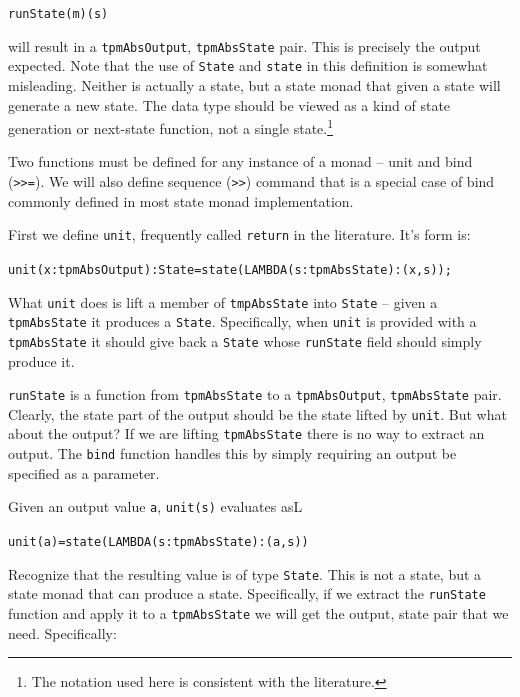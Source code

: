 \documentclass[10pt]{article}
\begin{document}
\begin{alltt}
  runState(m)(s)
\end{alltt}

\noindent will result in a \verb!tpmAbsOutput!, \verb!tpmAbsState!
pair.  This is precisely the output expected.  Note that the use of
\verb!State! and \verb!state! in this definition is somewhat
misleading.  Neither is actually a state, but a state monad that given
a state will generate a new state.  The data type should be viewed as
a kind of state generation or next-state function, not a single
state.\footnote{The notation used here is consistent with the
  literature.}

Two functions must be defined for any instance of a monad -- unit and
bind (\verb!>>=!).  We will also define sequence (\verb!>>!) command
that is a special case of bind commonly defined in most state monad
implementation.

First we define \verb!unit!, frequently called \verb!return! in the
literature.  It's form is:

\begin{alltt}
  unit(x:tpmAbsOutput):State = state(LAMBDA (s:tpmAbsState) : (x,s));
\end{alltt}

What \verb!unit! does is lift a member of \verb!tmpAbsState! into
\verb!State! -- given a \verb!tpmAbsState! it produces a \verb!State!.
Specifically, when \verb!unit! is provided with a \verb!tpmAbsState!
it should give back a \verb!State! whose \verb!runState! field should
simply produce it.

\verb!runState! is a function from \verb!tpmAbsState! to a
\verb!tpmAbsOutput!, \verb!tpmAbsState! pair.  Clearly, the state part
of the output should be the state lifted by \verb!unit!.  But what
about the output?  If we are lifting \verb!tpmAbsState! there is no
way to extract an output.  The \verb!bind! function handles this by
simply requiring an output be specified as a parameter.

Given an output value \verb!a!, \verb!unit(s)! evaluates asL

\begin{alltt}
  unit(a) = state(LAMBDA (s:tpmAbsState) : (a,s))
\end{alltt}

Recognize that the resulting value is of type \verb!State!.  This is
not a state, but a state monad that can produce a state.
Specifically, if we extract the \verb!runState! function and apply it
to a \verb!tpmAbsState! we will get the output, state pair that we
need.  Specifically:
\end{document}
